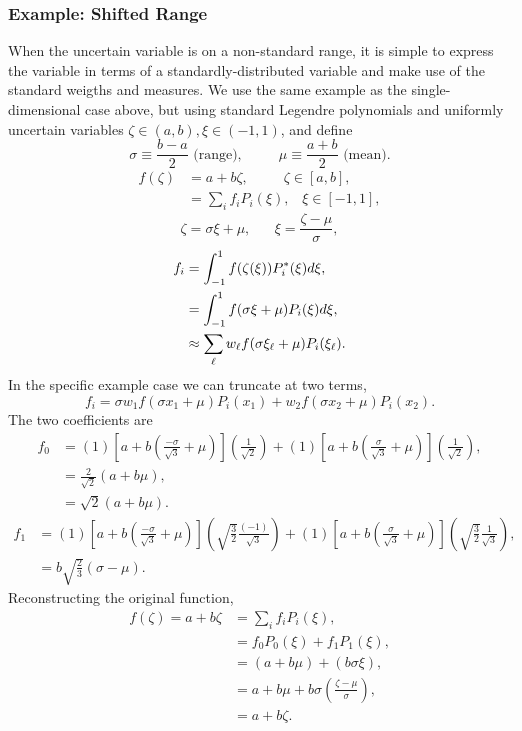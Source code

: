 \subsubsection{Example: Shifted Range}
When the uncertain variable is on a non-standard range, it is simple to express the variable in terms of a standardly-distributed variable and make use of the standard weigths and measures.  We use the same example as the single-dimensional case above, but using standard Legendre polynomials and uniformly uncertain variables $\zeta\in(a,b),\xi\in(-1,1)$, and define
\begin{equation}
\sigma \equiv \frac{b-a}{2} \text{ (range)}, \hspace{30pt} \mu\equiv \frac{a+b}{2} \text{ (mean)}.
\end{equation}
\begin{align}
f(\zeta)&=a+b\zeta,\hspace{30pt}\zeta\in[a,b],\\
  &=\sum_i f_i P_i(\xi),\hspace{10pt}\xi\in[-1,1],
\end{align}
\begin{equation}
\zeta=\sigma\xi+\mu,\hspace{20pt}\xi=\frac{\zeta-\mu}{\sigma},
\end{equation}
\begin{align}
f_i &= \int_{-1}^1 f(\zeta(\xi))P_i^*(\xi) d\xi,\\
    &=\int_{-1}^1 f(\sigma \xi+\mu) P_i(\xi)d\xi,\\
    &\approx \sum_\ell w_\ell f(\sigma \xi_\ell+\mu)P_i(\xi_\ell).
\end{align}
In the specific example case we can truncate at two terms,
\begin{equation}
f_i=\sigma w_1 f(\sigma x_1+\mu)P_i(x_1) + w_2 f(\sigma x_2+\mu)P_i(x_2).
\end{equation}
The two coefficients are
\begin{align}
f_0 &= (1)\left[a+b\left(\frac{-\sigma}{\sqrt{3}}+\mu\right)\right]\left(\frac{1}{\sqrt{2}}\right) + (1)\left[a+b\left(\frac{\sigma}{\sqrt{3}}+\mu\right)\right] \left(\frac{1}{\sqrt{2}}\right),\\
  &=\frac{2}{\sqrt{2}}(a+b\mu),\\
  &=\sqrt{2}(a+b\mu).
\end{align}
\begin{align}
f_1 &= (1)\left[a+b\left(\frac{-\sigma}{\sqrt{3}}+\mu\right)\right]\left(\sqrt{\frac{3}{2}}\frac{(-1)}{\sqrt{3}}\right) + (1)\left[a+b\left(\frac{\sigma}{\sqrt{3}}+\mu\right)\right]\left(\sqrt{\frac{3}{2}}\frac{1}{\sqrt{3}}\right),\\
  &=b\sqrt{\frac{2}{3}}(\sigma-\mu).
\end{align}
Reconstructing the original function,
\begin{align}
f(\zeta)=a+b\zeta&=\sum_i f_iP_i(\xi),\\
  &=f_0P_0(\xi) + f_1P_1(\xi),\\
  &=(a+b\mu) + (b\sigma\xi),\\
  &=a+b\mu+b\sigma\left(\frac{\zeta-\mu}{\sigma}\right),\\
  &=a+b\zeta.
\end{align}

